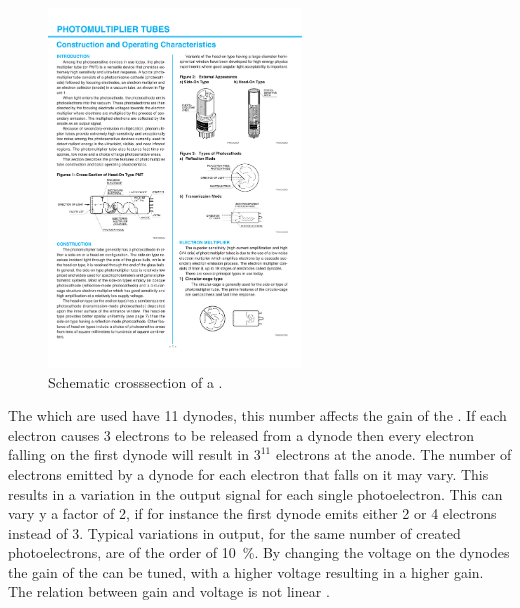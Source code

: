 \begin{figure}
    \centering
    \includegraphics[width=0.6\textwidth]
                    {plots/station/pmt_schematic}
    \caption{Schematic crosssection of a \pmt.}
    \label{fig:pmt_schematic}
\end{figure}

The \pmts which are used have 11 dynodes, this number affects the gain of the \pmt. If each electron causes \num{3} electrons to be released from a dynode then every electron falling on the first dynode will result in $3^11$ electrons at the anode. The number of electrons emitted by a dynode for each electron that falls on it may vary. This results in a variation in the output signal for each single photoelectron. This can vary  y a factor of 2, if for instance the first dynode emits either 2 or 4 electrons instead of 3. Typical variations in output, for the same number of created photoelectrons, are of the order of \SI{10}{\percent}. By changing the voltage on the dynodes the gain of the \pmt can be tuned, with a higher voltage resulting in a higher gain. The relation between gain and voltage is not linear \cite{hamamatsu2007handbook}.

